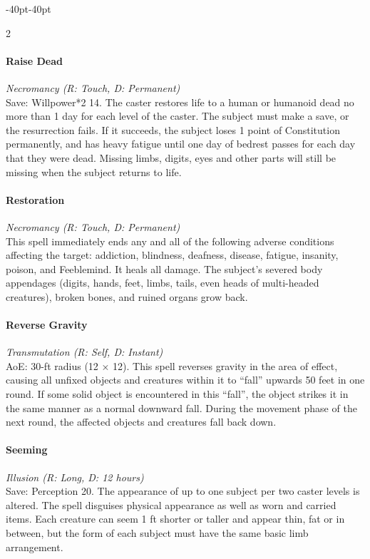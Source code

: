 \documentclass{book}
\begin{document}
\begin{adjustwidth}{-40pt}{-40pt}
\begin{multicols}{2}
\paragraph{Raise Dead}\label{raise-dead}

\emph{Necromancy (R: Touch, D: Permanent)}\\
Save: Willpower*2 14. The caster restores life to a human or humanoid
dead no more than 1 day for each level of the caster. The subject must
make a save, or the resurrection fails. If it succeeds, the subject
loses 1 point of Constitution permanently, and has heavy fatigue until
one day of bedrest passes for each day that they were dead. Missing
limbs, digits, eyes and other parts will still be missing when the
subject returns to life.

\paragraph{Restoration}\label{restoration}

\emph{Necromancy (R: Touch, D: Permanent)}\\
This spell immediately ends any and all of the following adverse
conditions affecting the target: addiction, blindness, deafness,
disease, fatigue, insanity, poison, and Feeblemind. It heals all damage.
The subject's severed body appendages (digits, hands, feet, limbs,
tails, even heads of multi-headed creatures), broken bones, and ruined
organs grow back.

\paragraph{Reverse Gravity}\label{reverse-gravity}

\emph{Transmutation (R: Self, D: Instant)}\\
AoE: 30-ft radius (12 × 12). This spell reverses gravity in the area of
effect, causing all unfixed objects and creatures within it to ``fall''
upwards 50 feet in one round. If some solid object is encountered in
this ``fall'', the object strikes it in the same manner as a normal
downward fall. During the movement phase of the next round, the affected
objects and creatures fall back down.

\paragraph{Seeming}\label{seeming}

\emph{Illusion (R: Long, D: 12 hours)}\\
Save: Perception 20. The appearance of up to one subject per two caster
levels is altered. The spell disguises physical appearance as well as
worn and carried items. Each creature can seem 1 ft shorter or taller
and appear thin, fat or in between, but the form of each subject must
have the same basic limb arrangement.


\end{multicols}
\end{adjustwidth}
\end{document}
